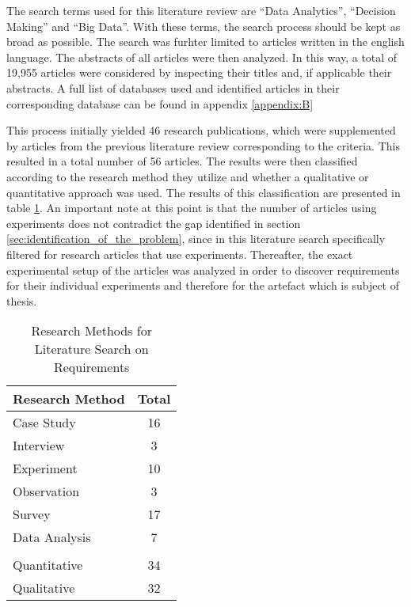 The search terms used for this literature review are \enquote{Data Analytics}, \enquote{Decision Making} and \enquote{Big Data}. With these terms, the search process should be kept as broad as possible. The search was furhter limited to articles written in the english language. The abstracts of all articles were then analyzed. In this way, a total of 19,955 articles were considered by inspecting their titles and, if applicable their abstracts. A full list of databases used and identified articles in their corresponding database can be found in appendix \ref{appendix:B}

This process initially yielded 46 research publications, which were supplemented by articles from the previous literature review corresponding to the criteria. This resulted in a total number of 56 articles. The results were then classified according to the research method they utilize and whether a qualitative or quantitative approach was used. The results of this classification are presented in table \ref{tab:secondLiteratureSearch}. An important note at this point is that the number of articles using experiments does not contradict the gap identified in section \ref{sec:identification_of_the_problem}, since in this literature search specifically filtered for research articles that use experiments. Thereafter, the exact experimental setup of the articles was analyzed in order to discover requirements for their individual experiments and therefore for the artefact which is subject of thesis.

\begin{table}[htbp]
    \centering
    \small
    \begin{tabular}{ll}
    \hline
    \multicolumn{1}{l}{Research Method} & \multicolumn{1}{l}{Total} \\ \hline
    \multicolumn{1}{l}{Case  Study}     & \multicolumn{1}{c}{16}    \\ 
    \multicolumn{1}{l}{Interview}       & \multicolumn{1}{c}{3}     \\ 
    \multicolumn{1}{l}{Experiment}      & \multicolumn{1}{c}{10}    \\ 
    \multicolumn{1}{l}{Observation}     & \multicolumn{1}{c}{3}     \\ 
    \multicolumn{1}{l}{Survey}          & \multicolumn{1}{c}{17}    \\ 
    \multicolumn{1}{l}{Data Analysis}   & \multicolumn{1}{c}{7}     \\ 
                                            &                            \\ \hline
    \multicolumn{1}{l}{Quantitative}    & \multicolumn{1}{c}{34}    \\ 
    \multicolumn{1}{l}{Qualitative}     & \multicolumn{1}{c}{32}    \\ \hline
    \end{tabular}
    \caption[Research Methods for Literature Search on Requirements]{Research Methods for Literature Search on Requirements}\label{tab:secondLiteratureSearch}
    \end{table}

